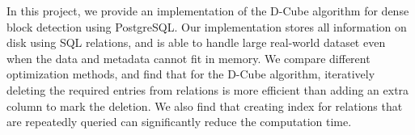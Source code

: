 
In this project, we provide an implementation of the D-Cube algorithm for dense block detection using PostgreSQL. Our implementation stores all information on disk using SQL relations, and is able to handle large real-world dataset even when the data and metadata cannot fit in memory.  We compare different optimization methods, and find that for the D-Cube algorithm, iteratively deleting the required entries from relations is more efficient than adding an extra column to mark the deletion. We also find that creating index for relations that are repeatedly queried can significantly reduce the computation time. 
